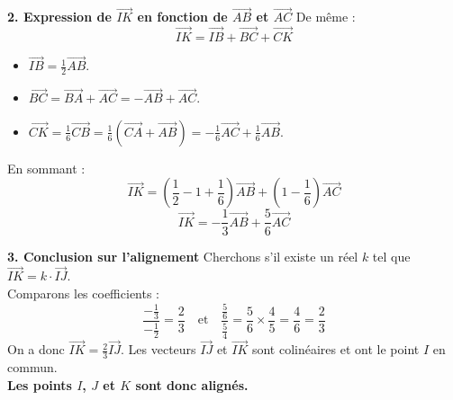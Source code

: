 \documentclass[12pt,a4paper]{article}
\begin{document}
\textbf{2. Expression de $\overrightarrow{IK}$ en fonction de $\overrightarrow{AB}$ et $\overrightarrow{AC}$}
De même :
\[ \overrightarrow{IK} = \overrightarrow{IB} + \overrightarrow{BC} + \overrightarrow{CK} \]
\begin{itemize}
    \item $\overrightarrow{IB} = \frac{1}{2}\overrightarrow{AB}$.
    \item $\overrightarrow{BC} = \overrightarrow{BA} + \overrightarrow{AC} = -\overrightarrow{AB} + \overrightarrow{AC}$.
    \item $\overrightarrow{CK} = \frac{1}{6}\overrightarrow{CB} = \frac{1}{6}(\overrightarrow{CA} + \overrightarrow{AB}) = -\frac{1}{6}\overrightarrow{AC} + \frac{1}{6}\overrightarrow{AB}$.
\end{itemize}
En sommant :
\[ \overrightarrow{IK} = \left( \frac{1}{2} - 1 + \frac{1}{6} \right)\overrightarrow{AB} + \left( 1 - \frac{1}{6} \right)\overrightarrow{AC} \]
\[ \overrightarrow{IK} = -\frac{1}{3}\overrightarrow{AB} + \frac{5}{6}\overrightarrow{AC} \]

\textbf{3. Conclusion sur l'alignement}
Cherchons s'il existe un réel $k$ tel que $\overrightarrow{IK} = k \cdot \overrightarrow{IJ}$. \\
Comparons les coefficients :
\[ \frac{-\frac{1}{3}}{-\frac{1}{2}} = \frac{2}{3} \quad \text{et} \quad \frac{\frac{5}{6}}{\frac{5}{4}} = \frac{5}{6} \times \frac{4}{5} = \frac{4}{6} = \frac{2}{3} \]
On a donc $\overrightarrow{IK} = \frac{2}{3}\overrightarrow{IJ}$. Les vecteurs $\overrightarrow{IJ}$ et $\overrightarrow{IK}$ sont colinéaires et ont le point $I$ en commun. \\
\textbf{Les points $I$, $J$ et $K$ sont donc alignés.}
\end{document}
